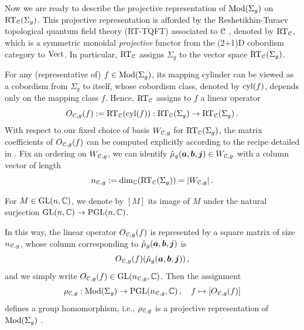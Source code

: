 \documentclass[11pt]{article}
\begin{document}
Now we are ready to describe the projective representation of $\MCG{g}$ on $\RTspace{\cC}{g}$. 
This projective representation is afforded by the Reshetikhin-Turaev topological quantum field theory (RT-TQFT) associated to $\cC$ \cite[Ch.\ IV]{Tur10}, denoted by $\RT_{\cC}$, which is a symmetric monoidal \emph{projective} functor from the (2+1)D cobordism category to $\Vec$. In particular, $\RT_{\cC}$ assigns $\Sigma_g$ to the vector space $\RTspace{\cC}{g}$.

For any (representative of) $f \in \mcg{g}$, its mapping cylinder can be viewed as a cobordism from $\Sigma_g$ to itself, whose cobordism class, denoted by $\cyl(f)$, depends only on the mapping class $f$. 
Hence, $\RT_{\cC}$ assigns to $f$ a linear operator
\[\RTmat{\cC}{g}(f) := \RT_{\cC}(\cyl(f)): \RTspace{\cC}{g} \to \RTspace{\cC}{g}\,.\]
With respect to our fixed choice of basis $W_{\cC,g}$ for $\RTspace{\cC}{g}$, the matrix coefficients of $\RTmat{\cC}{g}(f)$ can be computed explicitly according to the recipe detailed in \cite[Ch.\ IV]{Tur10}. Fix an ordering on $W_{\cC, g}$, we can identify $\Wbase{g}{a}{b}{j} \in W_{\cC, g}$ with a column vector of length
\begin{equation}
\label{eq:dim-Vg}
\ncg{\cC}{g} := \dim_{\bC}(\RTspace{\cC}{g}) = |W_{\cC,g}|\,.
\end{equation} 
\begin{definition} For $M \in \GL(n, \bC)$, we denote by $[M]$ its image of $M$ under the natural surjection  $\GL(n, \bC) \to \PGL(n, \bC)$. 
\end{definition}
In this way, the linear operator $\RTmat{\cC}{g}(f)$ is represented by a square matrix of size $\ncg{\cC}{g}$, whose column corresponding to $\Wbase{g}{a}{b}{j}$ is 
\begin{equation}
\RTmat{\cC}{g}(f)(\Wbase{g}{a}{b}{j})\,,
\end{equation} 
and we simply write $\RTmat{\cC}{g}(f) \in \GL(\ncg{\cC}{g}, \bC)$.  Then the assignment 
\begin{equation}\label{eq:RT-rep}
\RTrep{\cC}{g}: \MCG{g} \to \PGL(\ncg{\cC}{g}, \bC)\,,\quad f \mapsto [\RTmat{\cC}{g}(f)]	
\end{equation}
defines a group homomorphism, i.e., $\RTrep{\cC}{g}$ is a projective representation of $\MCG{g}$ \cite[Ch.\ IV]{Tur10}.  
\end{document}
